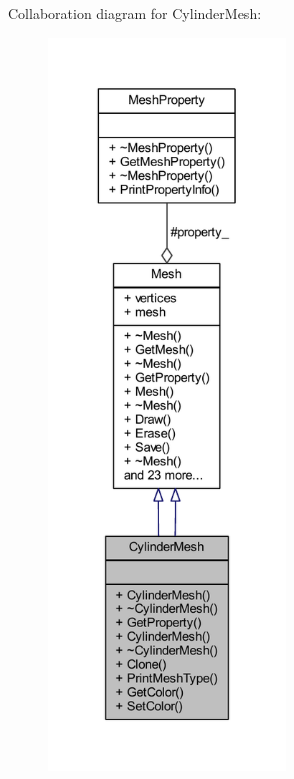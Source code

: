 Collaboration diagram for Cylinder\+Mesh\+:
\nopagebreak
\begin{figure}[H]
\begin{center}
\leavevmode
\includegraphics[height=550pt]{class_cylinder_mesh__coll__graph}
\end{center}
\end{figure}
